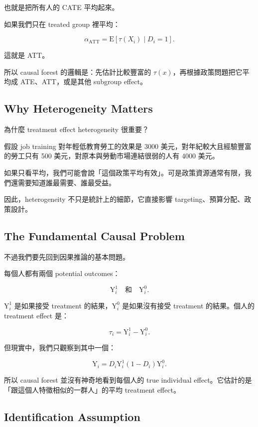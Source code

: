 \documentclass[
  chinese,
  11pt,
]{article}
\begin{document}
也就是把所有人的 CATE 平均起來。

如果我們只在 treated group 裡平均：

\[
\alpha_{\text{ATT}} =
\mathrm{E}\left[\tau(X_i)\mid D_i=1\right].
\]

這就是 ATT。

所以 causal forest 的邏輯是：先估計比較豐富的
\(\tau(x)\)，再根據政策問題把它平均成 ATE、ATT，或是其他 subgroup
effect。

\subsection{Why Heterogeneity Matters}\label{why-heterogeneity-matters}

為什麼 treatment effect heterogeneity 很重要？

假設 job training 對年輕低教育勞工的效果是 3000
美元，對年紀較大且經驗豐富的勞工只有 500
美元，對原本與勞動市場連結很弱的人有 4000 美元。

如果只看平均，我們可能會說「這個政策平均有效」。可是政策資源通常有限，我們還需要知道誰最需要、誰最受益。

因此，heterogeneity 不只是統計上的細節，它直接影響
targeting、預算分配、政策設計。

\subsection{The Fundamental Causal
Problem}\label{the-fundamental-causal-problem}

不過我們要先回到因果推論的基本問題。

每個人都有兩個 potential outcomes：

\[
\mathrm{Y}^{1}_{i}
\quad \text{和} \quad
\mathrm{Y}^{0}_{i}.
\]

\(\mathrm{Y}^{1}_{i}\) 是如果接受 treatment
的結果，\(\mathrm{Y}^{0}_{i}\) 是如果沒有接受 treatment 的結果。個人的
treatment effect 是：

\[
\tau_i=\mathrm{Y}^{1}_{i}-\mathrm{Y}^{0}_{i}.
\]

但現實中，我們只觀察到其中一個：

\[
\mathrm{Y}_i =
D_i\mathrm{Y}^{1}_{i}
(1-D_i)\mathrm{Y}^{0}_{i}.
\]

所以 causal forest 並沒有神奇地看到每個人的 true individual
effect。它估計的是「跟這個人特徵相似的一群人」的平均 treatment effect。

\subsection{Identification Assumption}\label{identification-assumption}
\end{document}
